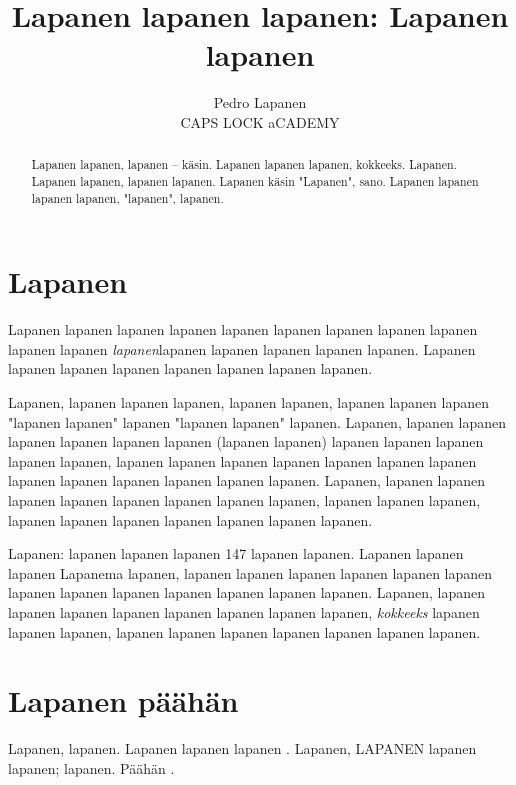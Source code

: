 \documentclass[a4paper]{article}
\title{Lapanen lapanen lapanen: Lapanen lapanen}
\date{}
\author{Pedro Lapanen\\CAPS LOCK aCADEMY}
\begin{document}
\maketitle

\renewcommand{\abstractname}{Lapaslapanen}

\begin{abstract}

Lapanen lapanen, lapanen -- käsin. Lapanen lapanen lapanen, kokkeeks. Lapanen. Lapanen lapanen, lapanen lapanen.
Lapanen käsin "Lapanen", sano. Lapanen lapanen lapanen lapanen, "lapanen", lapanen.

\end{abstract}

\begin{multicols}{2}

\section{Lapanen}
Lapanen lapanen lapanen lapanen lapanen lapanen lapanen lapanen lapanen lapanen lapanen  
\textit{lapanen}lapanen lapanen lapanen lapanen lapanen. 
Lapanen lapanen lapanen lapanen lapanen lapanen lapanen lapanen.

Lapanen, lapanen lapanen lapanen, lapanen lapanen, lapanen lapanen lapanen "lapanen lapanen" lapanen "lapanen lapanen" lapanen.
Lapanen, lapanen lapanen lapanen lapanen lapanen lapanen (lapanen lapanen) \cite{lapanen} lapanen lapanen lapanen lapanen lapanen,
lapanen lapanen lapanen lapanen lapanen lapanen lapanen lapanen lapanen lapanen lapanen lapanen lapanen.
Lapanen, lapanen lapanen lapanen lapanen lapanen lapanen lapanen lapanen, lapanen lapanen lapanen, lapanen lapanen lapanen lapanen lapanen lapanen lapanen.

Lapanen: lapanen lapanen lapanen 147 lapanen lapanen. Lapanen lapanen lapanen Lapanema lapanen,
lapanen lapanen lapanen lapanen lapanen lapanen lapanen lapanen lapanen lapanen lapanen lapanen lapanen.
Lapanen, lapanen lapanen lapanen lapanen lapanen lapanen \cite{liplap} lapanen lapanen, \textit{kokkeeks} lapanen lapanen lapanen, lapanen lapanen lapanen lapanen lapanen lapanen lapanen.

\vfill\null
\columnbreak

\section{Lapanen päähän}

Lapanen, lapanen. Lapanen lapanen lapanen \cite{lapanen}. Lapanen, LAPANEN lapanen lapanen; lapanen. Päähän \cite{turska}.



\end{multicols}
\end{document}

